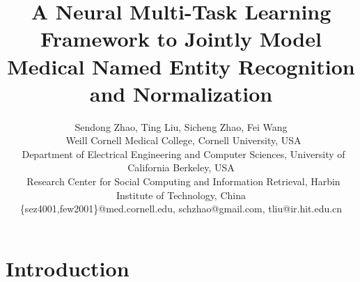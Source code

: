 \documentclass[letterpaper]{article} %
\begin{document}


\title{A Neural Multi-Task Learning Framework to Jointly Model \\Medical Named Entity Recognition and Normalization}


\author{
	Sendong Zhao\footnotemark[1], Ting Liu\footnotemark[3], Sicheng Zhao\footnotemark[2], Fei Wang\footnotemark[1]\\
	\footnotemark[1]~Weill Cornell Medical College, Cornell University, USA\\
	\footnotemark[2]~Department of Electrical Engineering and Computer Sciences, University of California Berkeley, USA\\
	\footnotemark[3]~Research Center for Social Computing and Information Retrieval, Harbin Institute of Technology, China  \\
	\{sez4001,few2001\}@med.cornell.edu, schzhao@gmail.com, tliu@ir.hit.edu.cn
}


\maketitle
\begin{abstract}

\end{abstract}

\section{Introduction}
\label{sec:intro}

\end{document}
